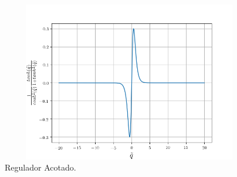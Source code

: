 \documentclass[12pt]{article}
\begin{document}
\begin{enumerate}
\begin{itemize}
        \begin{figure}[h]
            \centering
            \includegraphics[width=12cm, height=7cm]{IMAGENES/tanh.png}
            \caption{Regulador Acotado.}
            \label{fig:regulador}
        \end{figure}


\end{itemize}
\end{enumerate}
\end{document}
